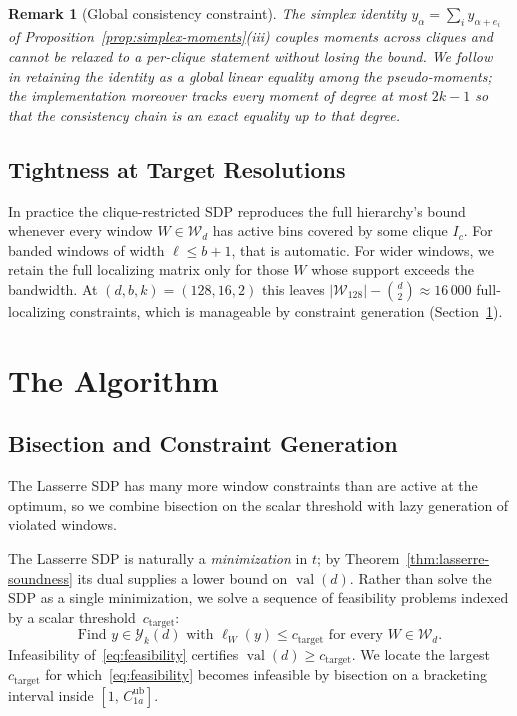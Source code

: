 \documentclass[11pt, letterpaper]{article}
\theoremstyle{paperplain}
\theoremstyle{paperdef}
\newtheorem{remark}[theorem]{Remark}
\newcommand{\val}{\operatorname{val}}
\begin{document}
\begin{remark}[Global consistency constraint]
\label{rem:global-consistency}
The simplex identity $y_\alpha=\sum_i y_{\alpha+e_i}$ of
Proposition~\ref{prop:simplex-moments}(iii) couples moments across
cliques and cannot be relaxed to a per-clique statement without
losing the bound.  We follow~\cite{Waki2006} in retaining the
identity as a global linear equality among the pseudo-moments; the
implementation moreover tracks every moment of degree at most $2k-1$
so that the consistency chain is an exact equality up to that degree.
\end{remark}

\subsection{Tightness at Target Resolutions}

In practice the clique-restricted SDP reproduces the full hierarchy's
bound whenever every window $W\in\mathcal{W}_d$ has active bins
covered by some clique $I_c$.  For banded windows of width
$\ell\le b+1$, that is automatic.  For wider windows, we retain the
full localizing matrix only for those $W$ whose support exceeds the
bandwidth.  At $(d,b,k)=(128,16,2)$ this leaves
$|\mathcal{W}_{128}|-\binom{d}{2}\approx 16\,000$ full-localizing
constraints, which is manageable by constraint generation
(Section~\ref{sec:algorithm}).


\section{The Algorithm}\label{sec:algorithm}

\subsection{Bisection and Constraint Generation}

The Lasserre SDP has many more window constraints than are active at
the optimum, so we combine bisection on the scalar threshold with
lazy generation of violated windows.

The Lasserre SDP is naturally a \emph{minimization} in $t$; by
Theorem~\ref{thm:lasserre-soundness} its dual supplies a lower bound
on $\val(d)$.  Rather than solve the SDP as a single minimization, we
solve a sequence of feasibility problems indexed by a scalar
threshold~$c_{\mathrm{target}}$:
\begin{equation}\label{eq:feasibility}
  \text{Find } y\in\mathcal{Y}_k(d)\text{ with }
  \ell_W(y) \le c_{\mathrm{target}}\text{ for every }W\in\mathcal{W}_d.
\end{equation}
Infeasibility of~\eqref{eq:feasibility} certifies
$\val(d)\ge c_{\mathrm{target}}$.  We locate the largest
$c_{\mathrm{target}}$ for which~\eqref{eq:feasibility} becomes
infeasible by bisection on a bracketing interval inside
$[1,\,C_{1a}^{\mathrm{ub}}]$.
\end{document}
